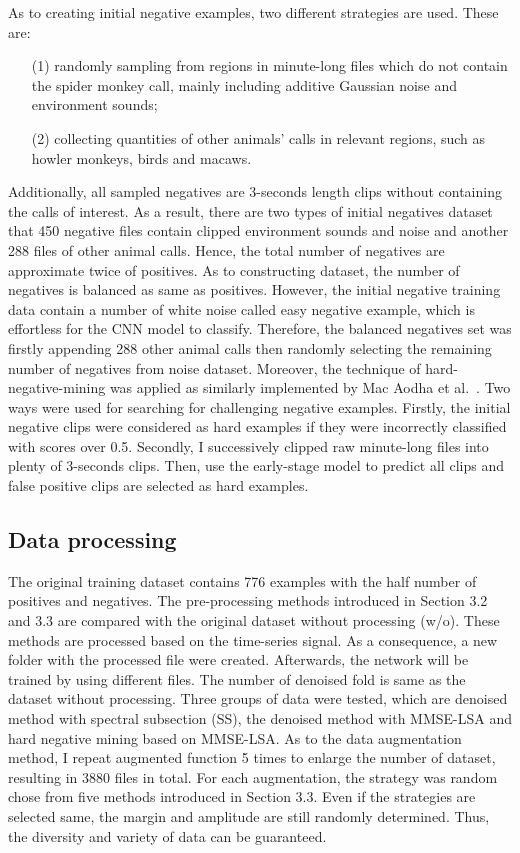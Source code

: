 As to creating initial negative examples, two different strategies are used. These are:
\begin{itemize}
\item[(1)] randomly sampling from regions in minute-long files which do not contain the spider monkey call, mainly including additive Gaussian noise and environment sounds;
\item[(2)] collecting quantities of other animals' calls in relevant regions, such as howler monkeys, birds and macaws.
\end{itemize}
Additionally, all sampled negatives are 3-seconds length clips without containing the calls of interest. As a result, there are two types of initial negatives dataset that 450 negative files contain clipped environment sounds and noise and another 288 files of other animal calls. Hence, the total number of negatives are approximate twice of positives. As to constructing dataset, the number of negatives is balanced as same as positives. However, the initial negative training data contain a number of white noise called easy negative example, which is effortless for the CNN model to classify. Therefore, the balanced negatives set was firstly appending 288 other animal calls then randomly selecting the remaining number of negatives from noise dataset.
Moreover, the technique of hard-negative-mining was applied as similarly implemented by Mac Aodha et al.~\cite{batdetect18}. Two ways were used for searching for challenging negative examples. Firstly, the initial negative clips were considered as hard examples if they were incorrectly classified with scores over 0.5. Secondly, I successively clipped raw minute-long files into plenty of 3-seconds clips. Then, use the early-stage model to predict all clips and false positive clips are selected as hard examples. \par
\subsection{Data processing}
The original training dataset contains 776 examples with the half number of positives and negatives. The pre-processing methods introduced in Section 3.2 and 3.3 are compared with the original dataset without processing (w/o). These methods are processed based on the time-series signal. As a consequence, a new folder with the processed file were created. Afterwards, the network will be trained by using different files. The number of denoised fold is same as the dataset without processing. Three groups of data were tested, which are denoised method with spectral subsection (SS), the denoised method with MMSE-LSA and hard negative mining based on MMSE-LSA. As to the data augmentation method, I repeat augmented function 5 times to enlarge the number of dataset, resulting in 3880 files in total. For each augmentation, the strategy was random chose from five methods introduced in Section 3.3. Even if the strategies are selected same, the margin and amplitude are still randomly determined. Thus, the diversity and variety of data can be guaranteed.

